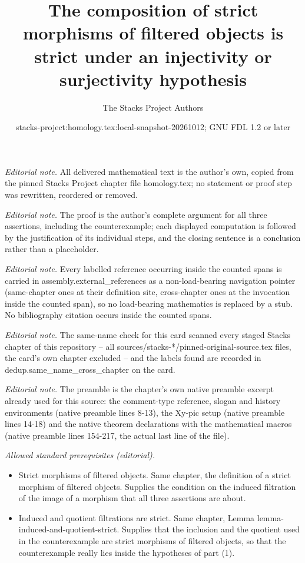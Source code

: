 \documentclass[10pt,a4paper]{amsart}
\title{The composition of strict morphisms of filtered objects is strict under an injectivity or surjectivity hypothesis}
\author{The Stacks Project Authors}
\date{stacks-project:homology.tex:local-snapshot-20261012; GNU FDL 1.2 or later}
\theoremstyle{plain}
\theoremstyle{definition}
\theoremstyle{remark}
\numberwithin{equation}{subsection}
\begin{document}
\maketitle
\noindent\textit{Editorial note.} All delivered mathematical text is the author's own, copied from the pinned Stacks Project chapter file homology.tex; no statement or proof step was rewritten, reordered or removed.\par\medskip
\noindent\textit{Editorial note.} The proof is the author's complete argument for all three assertions, including the counterexample; each displayed computation is followed by the justification of its individual steps, and the closing sentence is a conclusion rather than a placeholder.\par\medskip
\noindent\textit{Editorial note.} Every labelled reference occurring inside the counted spans is carried in assembly.external\_references as a non-load-bearing navigation pointer (same-chapter ones at their definition site, cross-chapter ones at the invocation inside the counted span), so no load-bearing mathematics is replaced by a stub. No bibliography citation occurs inside the counted spans.\par\medskip
\noindent\textit{Editorial note.} The same-name check for this card scanned every staged Stacks chapter of this repository -- all sources/stacks-*/pinned-original-source.tex files, the card's own chapter excluded -- and the labels found are recorded in dedup.same\_name\_cross\_chapter on the card.\par\medskip
\noindent\textit{Editorial note.} The preamble is the chapter's own native preamble excerpt already used for this source: the comment-type reference, slogan and history environments (native preamble lines 8-13), the Xy-pic setup (native preamble lines 14-18) and the native theorem declarations with the mathematical macros (native preamble lines 154-217, the actual last line of the file).\par\medskip
\noindent\textit{Allowed standard prerequisites (editorial).}\begin{itemize}
\item Strict morphisms of filtered objects. Same chapter, the definition of a strict morphism of filtered objects. Supplies the condition on the induced filtration of the image of a morphism that all three assertions are about.
\item Induced and quotient filtrations are strict. Same chapter, Lemma lemma-induced-and-quotient-strict. Supplies that the inclusion and the quotient used in the counterexample are strict morphisms of filtered objects, so that the counterexample really lies inside the hypotheses of part (1).
\end{itemize}\medskip
\end{document}
